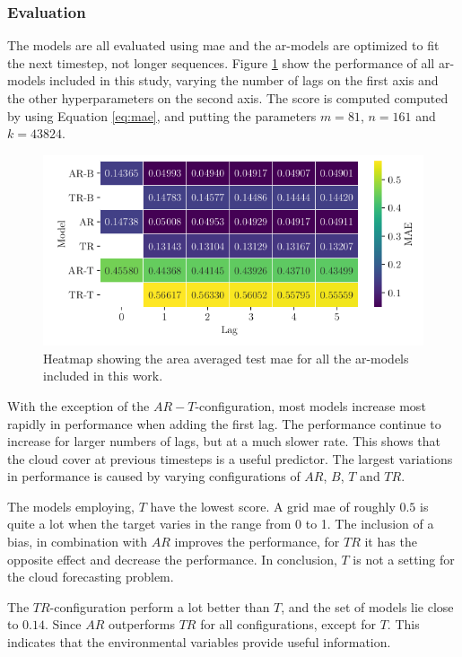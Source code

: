 \subsubsection{Evaluation}
The models are all evaluated using \acrfull{mae} and the \acrshort{ar}-models are optimized to fit the next timestep, not longer sequences. Figure \ref{fig:heatmap_ar_models} show the performance of all \acrshort{ar}-models included in this study, varying the number of lags on the first axis and the other hyperparameters on the second axis. The score is computed computed by using Equation \eqref{eq:mae}, and putting the parameters $m = 81$, $n=161$ and $k=43824$. 
\begin{figure}
    \centering
    \includegraphics{python_figs/heat_ar_model_mae_test_score.png}
    \caption{Heatmap showing the area averaged test \acrshort{mae} for all the \acrshort{ar}-models included in this work. }
    \label{fig:heatmap_ar_models}
\end{figure}

With the exception of the $AR-T$-configuration, most models increase most rapidly in performance when adding the first lag. The performance continue to increase for larger numbers of lags, but at a much slower rate. This shows that the cloud cover at previous timesteps is a useful predictor. The largest variations in performance is caused by varying configurations of $AR$, $B$, $T$ and $TR$. 

The models employing, $T$ have the lowest score. A grid \acrshort{mae} of roughly $0.5$ is quite a lot when the target varies in the range from 0 to 1. The inclusion of a bias, in combination with $AR$ improves the performance, for $TR$ it has the opposite effect and decrease the performance. In conclusion, $T$ is not a setting for the cloud forecasting problem.


The $TR$-configuration perform a lot better than $T$, and the set of models lie close to $0.14$. Since $AR$ outperforms $TR$ for all configurations, except for $T$. This indicates that the environmental variables provide useful information.

